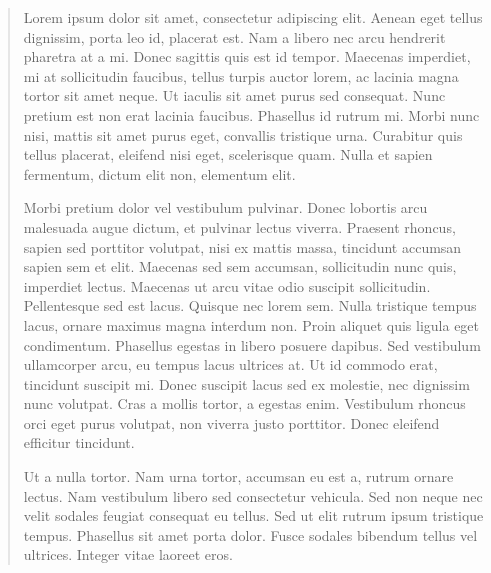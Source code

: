 \vspace*{2cm}
\pagestyle{empty}
\begin{quotation}
\begin{itshape}
Lorem ipsum dolor sit amet, consectetur adipiscing elit. Aenean eget tellus
dignissim, porta leo id, placerat est. Nam a libero nec arcu hendrerit pharetra
at a mi. Donec sagittis quis est id tempor. Maecenas imperdiet, mi at
sollicitudin faucibus, tellus turpis auctor lorem, ac lacinia magna tortor sit
amet neque. Ut iaculis sit amet purus sed consequat. Nunc pretium est non erat
lacinia faucibus. Phasellus id rutrum mi. Morbi nunc nisi, mattis sit amet
purus eget, convallis tristique urna. Curabitur quis tellus placerat, eleifend
nisi eget, scelerisque quam. Nulla et sapien fermentum, dictum elit non,
elementum elit. 
\vspace{2cm}

Morbi pretium dolor vel vestibulum pulvinar. Donec lobortis arcu malesuada
augue dictum, et pulvinar lectus viverra. Praesent rhoncus, sapien sed
porttitor volutpat, nisi ex mattis massa, tincidunt accumsan sapien sem et
elit. Maecenas sed sem accumsan, sollicitudin nunc quis, imperdiet lectus.
Maecenas ut arcu vitae odio suscipit sollicitudin. Pellentesque sed est lacus.
Quisque nec lorem sem. Nulla tristique tempus lacus, ornare maximus magna
interdum non. Proin aliquet quis ligula eget condimentum. Phasellus egestas in
libero posuere dapibus. Sed vestibulum ullamcorper arcu, eu tempus lacus
ultrices at. Ut id commodo erat, tincidunt suscipit mi. Donec suscipit lacus
sed ex molestie, nec dignissim nunc volutpat. Cras a mollis tortor, a egestas
enim. Vestibulum rhoncus orci eget purus volutpat, non viverra justo porttitor.
Donec eleifend efficitur tincidunt.
\vspace{2cm}

Ut a nulla tortor. Nam urna tortor, accumsan eu est a, rutrum ornare lectus.
Nam vestibulum libero sed consectetur vehicula. Sed non neque nec velit sodales
feugiat consequat eu tellus. Sed ut elit rutrum ipsum tristique tempus.
Phasellus sit amet porta dolor. Fusce sodales bibendum tellus vel ultrices.
Integer vitae laoreet eros. 
\end{itshape}
\end{quotation}
